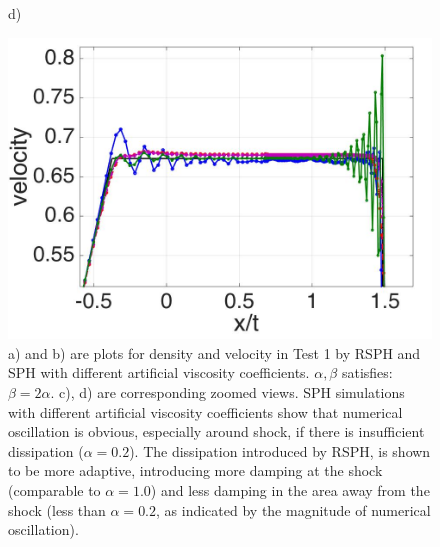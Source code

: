 \begin{figure}[H]
\begin{minipage}{.45 \textwidth}
    \end{minipage}%
    \begin{minipage}{.545\textwidth}
    \centering d)
        \begin{flushleft}
        \includegraphics[width= 0.8174 \textwidth, height=0.5780 \textwidth]{./Figures/RCM-Sod-SPH-alf-v-zoom}    
        \end{flushleft}
    \end{minipage}%
    \caption{a) and b) are plots for density and velocity in Test 1 by RSPH and SPH with different artificial viscosity coefficients. $\alpha,\beta$ satisfies: $\beta=2\alpha$.  c), d) are corresponding zoomed views. SPH simulations with different artificial viscosity coefficients show that numerical oscillation is obvious, especially around shock, if there is insufficient dissipation ($\alpha=0.2$). The dissipation introduced by RSPH, is shown to be more adaptive, introducing more damping at the shock (comparable to $\alpha=1.0$) and less damping in the area away from the shock (less than $\alpha=0.2$, as indicated by the magnitude of numerical oscillation).}
    \label{fig:RCM-Sod-SPH-alf}
\end{figure}

